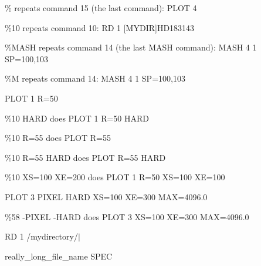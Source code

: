 {\newpage\clearpage
{}%
\begin{example}
   \item[\%\hfill]{repeats command 15 (the last command):  PLOT 4}
   \item[\%10\hfill]{repeats command 10:  RD 1 [MYDIR]HD183143}
   \item[\%MASH \hfill]{repeats command 14 (the last MASH command): 
       MASH 4 1 SP=100,103}
   \item[\%M\hfill]{repeats command 14:  MASH 4 1 SP=100,103}
\end{example}%
\lthtmlfigureZ
\lthtmlcheckvsize\clearpage}

{\newpage\clearpage
{}%
\begin{hanging}
  \item{PLOT 1 R=50}
\end{hanging}%
\lthtmlfigureZ
\lthtmlcheckvsize\clearpage}

{\newpage\clearpage
{}%
\begin{example}
  \item[\%10 HARD\hfill]{does PLOT 1 R=50 HARD}
  \item[\%10 R=55\hfill]{does PLOT R=55}
  \item[\%10 R=55 HARD\hfill]{does PLOT R=55 HARD}
  \item[\%10 XS=100 XE=200\hfill]{does PLOT 1 R=50 XS=100 XE=100}
\end{example}%
\lthtmlfigureZ
\lthtmlcheckvsize\clearpage}

{\newpage\clearpage
{}%
\begin{hanging}
  \item{PLOT 3 PIXEL HARD XS=100 XE=300 MAX=4096.0}
\end{hanging}%
\lthtmlfigureZ
\lthtmlcheckvsize\clearpage}

{\newpage\clearpage
{}%
\begin{example}
  \item[\%58 -PIXEL -HARD\hfill]{does PLOT 3 XS=100 XE=300 MAX=4096.0}
\end{example}%
\lthtmlfigureZ
\lthtmlcheckvsize\clearpage}

{\newpage\clearpage
{}%
\begin{hanging}
  \item{ RD 1 /mydirectory/$|$}
  \item{really\_long\_file\_name SPEC}
\end{hanging}%
\lthtmlfigureZ
\lthtmlcheckvsize\clearpage}

